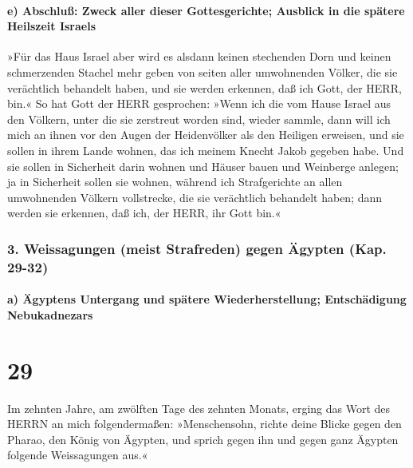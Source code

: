 \hypertarget{e-abschluuxdf-zweck-aller-dieser-gottesgerichte-ausblick-in-die-spuxe4tere-heilszeit-israels}{%
\paragraph{e) Abschluß: Zweck aller dieser Gottesgerichte; Ausblick in
die spätere Heilszeit
Israels}\label{e-abschluuxdf-zweck-aller-dieser-gottesgerichte-ausblick-in-die-spuxe4tere-heilszeit-israels}}

»Für das Haus Israel aber wird es alsdann keinen
stechenden Dorn und keinen schmerzenden Stachel mehr geben von seiten
aller umwohnenden Völker, die sie verächtlich behandelt haben, und sie
werden erkennen, daß ich Gott, der HERR, bin.« So hat
Gott der HERR gesprochen: »Wenn ich die vom Hause Israel aus den
Völkern, unter die sie zerstreut worden sind, wieder sammle, dann will
ich mich an ihnen vor den Augen der Heidenvölker als den Heiligen
erweisen, und sie sollen in ihrem Lande wohnen, das ich meinem Knecht
Jakob gegeben habe. Und sie sollen in Sicherheit darin
wohnen und Häuser bauen und Weinberge anlegen; ja in Sicherheit sollen
sie wohnen, während ich Strafgerichte an allen umwohnenden Völkern
vollstrecke, die sie verächtlich behandelt haben; dann werden sie
erkennen, daß ich, der HERR, ihr Gott bin.«

\hypertarget{weissagungen-meist-strafreden-gegen-uxe4gypten-kap.-29-32}{%
\subsubsection{3. Weissagungen (meist Strafreden) gegen Ägypten (Kap.
29-32)}\label{weissagungen-meist-strafreden-gegen-uxe4gypten-kap.-29-32}}

\hypertarget{a-uxe4gyptens-untergang-und-spuxe4tere-wiederherstellung-entschuxe4digung-nebukadnezars}{%
\paragraph{a) Ägyptens Untergang und spätere Wiederherstellung;
Entschädigung
Nebukadnezars}\label{a-uxe4gyptens-untergang-und-spuxe4tere-wiederherstellung-entschuxe4digung-nebukadnezars}}

\hypertarget{section-28}{%
\section{29}\label{section-28}}

Im zehnten Jahre, am zwölften Tage des zehnten Monats,
erging das Wort des HERRN an mich folgendermaßen:
»Menschensohn, richte deine Blicke gegen den Pharao, den
König von Ägypten, und sprich gegen ihn und gegen ganz Ägypten folgende
Weissagungen aus.«

